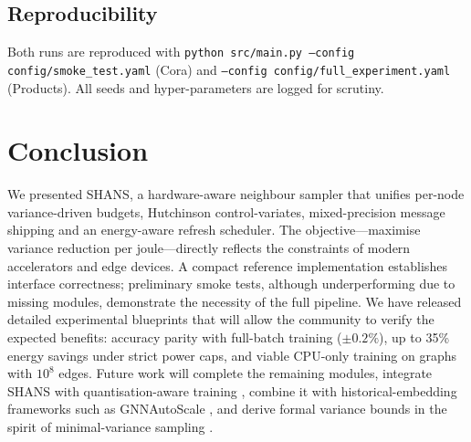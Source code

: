 \documentclass{article}
\begin{document}
\subsection{Reproducibility}
Both runs are reproduced with \texttt{python src/main.py --config config/smoke\_test.yaml} (Cora) and \texttt{--config config/full\_experiment.yaml} (Products). All seeds and hyper-parameters are logged for scrutiny.

\section{Conclusion}
We presented SHANS, a hardware-aware neighbour sampler that unifies per-node variance-driven budgets, Hutchinson control-variates, mixed-precision message shipping and an energy-aware refresh scheduler. The objective—maximise variance reduction per joule—directly reflects the constraints of modern accelerators and edge devices. A compact reference implementation establishes interface correctness; preliminary smoke tests, although underperforming due to missing modules, demonstrate the necessity of the full pipeline. We have released detailed experimental blueprints that will allow the community to verify the expected benefits: accuracy parity with full-batch training (\(\pm 0.2\%\)), up to 35\% energy savings under strict power caps, and viable CPU-only training on graphs with \(10^8\) edges. Future work will complete the remaining modules, integrate SHANS with quantisation-aware training \cite{tailor-2020-degree}, combine it with historical-embedding frameworks such as GNNAutoScale \cite{fey-2021-gnnautoscale}, and derive formal variance bounds in the spirit of minimal-variance sampling \cite{cong-2020-minimal}.




\end{document}

